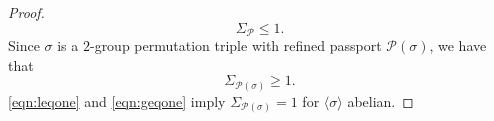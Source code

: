 \documentclass{dcthesis}
\newcommand{\ZZ}{\mathbb Z}
\newcommand{\wt}[1]{\widetilde{#1}}
\numberwithin{equation}{section}
\theoremstyle{definition}
\theoremstyle{remark}
\begin{document}
{{{\begin{proof}
\begin{equation}
        \label{eqn:leqone}
        \Sigma_{\mathscr{P}}\leq 1.
      \end{equation}
      Since $\sigma$ is a $2$-group
      permutation triple with refined passport
      $\mathscr{P}(\sigma)$,
      we have that
      \begin{equation}
        \label{eqn:geqone}
        \Sigma_{\mathscr{P}(\sigma)}\geq 1.
      \end{equation}
      \eqref{eqn:leqone} and
      \eqref{eqn:geqone}
      imply
      $\Sigma_{\mathscr{P}(\sigma)}=1$
      for $\langle\sigma\rangle$ abelian.
    \end{proof}
}}}
\end{document}
